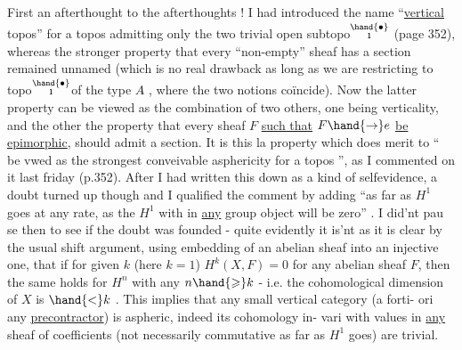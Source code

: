 First an afterthought to the afterthoughts ! I had introduced
the name ``\uline{vertical} topos'' for a topos admitting only the two trivial
open subtopo$\overset{\hand{\bullet}}{\text{\i}}$ (page 352), whereas the stronger property that every
``non-empty'' sheaf has a section remained unnamed (which is no real
drawback as long as we are restricting to topo$\overset{\hand{\bullet}}{\text{\i}}$\hand{/}of the type $A\hat{}$ , where
 the two notions coïncide). Now the latter property can be viewed as
the combination of two others, one being verticality, and the other
the property that every sheaf $F$ \uline{such that} $F \hand{\to} e$ \uline{be epimorphic},
should admit a section. It is this la property which does merit
to `` be vwed as the strongest conveivable asphericity  for a topos '',
as I commented on it last friday (p.352). After I had written this
down as a kind of selfevidence,  a doubt turned up though and I
qualified the comment by adding ``as far as $H^1$ goes at any rate, as
the $H^1$ with   in \uline{any} group object will be zero'' . I did'nt pau%
se then to see if the doubt was founded - quite evidently it is'nt\hand{,}
 as it is clear by the usual shift argument, using embedding of 
an abelian sheaf into an injective one, that if  for given
$k$ (here $k=1$) $H^k(X,F) = 0$ for any abelian sheaf $F$, then the same
holds for $H^n$ with any $n \hand{\geqslant} k$ - i.e. the  cohomological dimension of $X$
is $\hand{<} k$ . This implies that  any small vertical category (a forti-%
ori any  \uline{precontractor}) is aspheric, indeed its cohomology in-%
vari with values in \uline{any} sheaf of coefficients (not necessarily
commutative as far as $H^1$ goes) are trivial.


